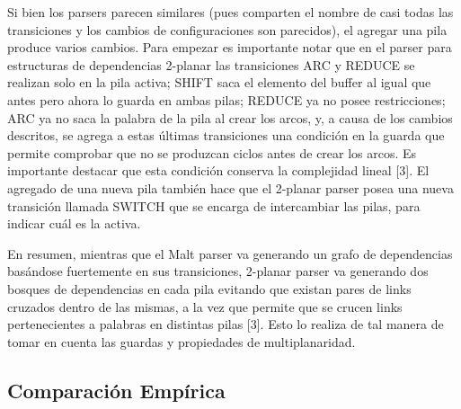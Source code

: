 \documentclass[11pt,a4paper,spanish]{article}
\begin{document}
Si bien los parsers parecen similares (pues comparten el nombre de casi todas las transiciones y 
los cambios de configuraciones son parecidos), el agregar una pila produce varios cambios. Para 
empezar es importante notar que en el parser para estructuras de dependencias 2-planar las 
transiciones ARC y REDUCE se realizan solo en la pila activa; SHIFT saca el elemento del buffer al igual que antes pero ahora lo guarda en ambas pilas; REDUCE ya no posee restricciones; ARC ya no saca la palabra de la pila al crear los arcos, y, a causa de los cambios descritos, se agrega a estas últimas transiciones una condición en la guarda que permite comprobar que no se produzcan ciclos 
antes de crear los arcos. Es importante destacar que esta condición conserva la complejidad lineal 
[3]. El agregado de una nueva pila también hace que el 2-planar parser posea una nueva transición llamada SWITCH que se encarga de intercambiar las pilas, para indicar cuál es la activa.

En resumen, mientras que el Malt parser va generando un grafo de dependencias basándose fuertemente 
en sus transiciones, 2-planar parser va generando dos bosques de dependencias en cada pila evitando 
que existan pares de links cruzados dentro de las mismas, a la vez que permite que se crucen links pertenecientes a palabras en distintas pilas [3]. Esto lo realiza de tal manera de tomar en cuenta
las guardas y propiedades de multiplanaridad.

\subsection{Comparación Empírica} 
\end{document}
